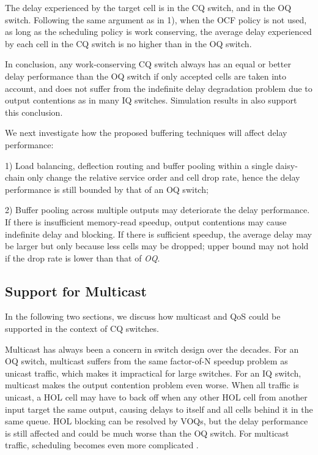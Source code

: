 \documentclass[journal,final,doublecolumn,10pt,twoside]{IEEEtranTCOM} \normalsize
\begin{document}
The delay experienced by the target cell is  in the CQ switch, and   in the OQ switch. Following the same argument as in 1), when the OCF policy is not used, as long as the scheduling policy is work conserving, the average delay experienced by each cell in the CQ switch is no higher than in the OQ switch. 

In conclusion, any work-conserving CQ switch always has an equal or better delay performance than the OQ switch if only accepted cells are taken into account, and does not suffer from the indefinite delay degradation problem due to output contentions as in many IQ switches. Simulation results in \cite{radonjic01,radonjic02} also support this conclusion.

We next investigate how the proposed buffering techniques will affect delay performance:

1) Load balancing, deflection routing and buffer pooling within a single daisy-chain only change the relative service order and cell drop rate, hence the delay performance is still bounded by that of an OQ switch;

2) Buffer pooling across multiple outputs may deteriorate the delay performance. If there is insufficient memory-read speedup, output contentions may cause indefinite delay and blocking. If there is sufficient speedup, the average delay may be larger but only because less cells may be dropped; upper bound may not hold if the drop rate is lower than that of \emph{OQ}.


\subsection {Support for Multicast}
In the following two sections, we discuss how multicast and QoS could be supported in the context of CQ switches.

Multicast has always been a concern in switch design over the decades. For an OQ switch, multicast suffers from the same factor-of-N speedup problem as unicast traffic, which makes it impractical for large switches. For an IQ switch, multicast makes the output contention problem even worse. When all traffic is unicast, a HOL cell may have to back off when any other HOL cell from another input target the same output, causing delays to itself and all cells behind it in the same queue. HOL blocking can be resolved by VOQs, but the delay performance is still affected and could be much worse than the OQ switch. For multicast traffic, scheduling becomes even more complicated \cite{multicast,iqmulticast}. 
\end{document}
